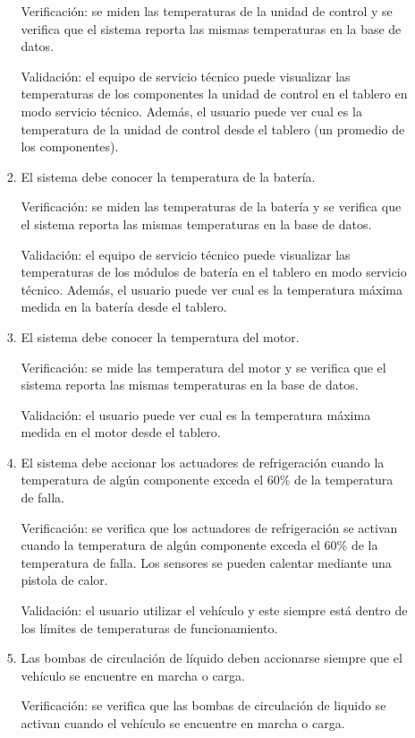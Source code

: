 \documentclass[
11pt, %
codirector, %
]{charter}
\begin{document}
\begin{enumerate}
\begin{enumerate}
\begin{enumerate}
			                  Verificación: se miden las temperaturas de la unidad de control y se verifica que el sistema reporta las mismas temperaturas en la base de datos.

			                  Validación: el equipo de servicio técnico puede visualizar las temperaturas de los componentes la unidad de control en el tablero en modo servicio técnico. Además, el usuario puede ver cual es la temperatura de la unidad de control desde el tablero (un promedio de los componentes).
			            \item El sistema debe conocer la temperatura de la batería.

			                  Verificación: se miden las temperaturas de la batería y se verifica que el sistema reporta las mismas temperaturas en la base de datos.

			                  Validación: el equipo de servicio técnico puede visualizar las temperaturas de los módulos de batería en el tablero en modo servicio técnico. Además, el usuario puede ver cual es la temperatura máxima medida en la batería desde el tablero.
			            \item El sistema debe conocer la temperatura del motor.

			                  Verificación: se mide las temperatura del motor y se verifica que el sistema reporta las mismas temperaturas en la base de datos.

			                  Validación: el usuario puede ver cual es la temperatura máxima medida en el motor desde el tablero.

			            \item El sistema debe accionar los actuadores de refrigeración cuando la temperatura de algún componente exceda el 60\% de la temperatura de falla.

			                  Verificación: se verifica que los actuadores de refrigeración se activan cuando la temperatura de algún componente exceda el 60\% de la temperatura de falla. Los sensores se pueden calentar mediante una pistola de calor.

			                  Validación: el usuario utilizar el vehículo y este siempre está dentro de los límites de temperaturas de funcionamiento.

			            \item Las bombas de circulación de líquido deben accionarse siempre que el vehículo se encuentre en marcha o carga.

			                  Verificación: se verifica que las bombas de circulación de liquido se activan cuando el vehículo se encuentre en marcha o carga.


\end{enumerate}
\end{enumerate}
\end{enumerate}
\end{document}
